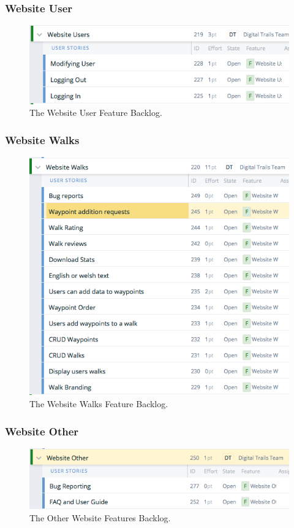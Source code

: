 \documentclass[11pt,a4paper]{article}
\begin{document}
\subsubsection{Website User}
\begin{figure}[H]
\centering
\includegraphics[width = 140mm]{backlog/WebUser.png}
\caption{The Website User Feature Backlog.}
\label{fig:backlogwebUser}
\end{figure}

\subsubsection{Website Walks}
\begin{figure}[H]
\centering
\includegraphics[width = 140mm]{backlog/WebWalks.png}
\caption{The Website Walks Feature Backlog.}
\label{fig:backlogwebwalk}
\end{figure}

\subsubsection{Website Other}
\begin{figure}[H]
\centering
\includegraphics[width = 140mm]{backlog/WebOther.png}
\caption{The Other Website Features Backlog.}
\label{fig:backlogwebother}
\end{figure}
\end{document}
